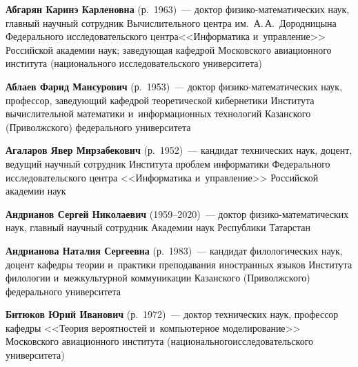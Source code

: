 \begin{multicols}{2}


\noindent
\textbf{Абгарян Каринэ Карленовна} (р.\ 1963)~--- доктор 
фи\-зи\-ко-ма\-те\-ма\-ти\-че\-ских наук, главный научный со\-труд\-ник Вычислительного цент\-ра им.\
 А.\,А.~Дородницына Федерального исследовательского цент\-ра\linebreak <<Информатика и~управ\-ле\-ние>>
  Российской академии наук; за\-ве\-ду\-ющая ка\-фед\-рой Московского авиационного института
   (национального исследовательского университета)
   
   \vspace*{3pt}


\noindent
\textbf{Аблаев Фарид Мансурович} (р.\ 1953)~--- доктор фи\-зи\-ко-ма\-те\-ма\-ти\-че\-ских наук, 
профессор, за\-ве\-ду\-ющий ка\-фед\-рой тео\-ре\-ти\-че\-ской кибернетики Института 
вы\-чис\-ли\-тель\-ной математики и~информационных технологий Казанского (Приволжского) 
федерального университета

\vspace*{3pt}

\noindent
\textbf{Агаларов Явер Мирзабекович} (р.\ 1952)~--- 
кандидат технических наук, доцент, ведущий научный сотрудник Института проб\-лем информатики 
Федерального исследовательского цент\-ра <<Информатика и~управ\-ле\-ние>> Российской академии наук

\vspace*{3pt}



\noindent
\textbf{Андрианов Сергей Николаевич} (1959--2020)~--- 
доктор фи\-зи\-ко-ма\-те\-ма\-ти\-че\-ских наук, 
главный научный сотрудник Академии наук Республики Татарстан

\vspace*{3pt}

\noindent
\textbf{Андрианова Наталия Сергеевна} (р.\ 1983)~--- 
кандидат филологических наук, доцент кафедры тео\-рии и~прак\-ти\-ки 
преподавания иностранных языков Института филологии и~межкультурной 
коммуникации Казанского (Приволжского) федерального университета 




\vspace*{3pt}

\noindent
\textbf{Битюков Юрий Иванович} (р.\ 1972)~--- 
доктор технических наук, профессор ка\-фед\-ры <<Тео\-рия вероятностей и~компьютерное моделирование>>
 Московского авиационного института (национального\linebreak исследовательского университета)


\end{multicols}
